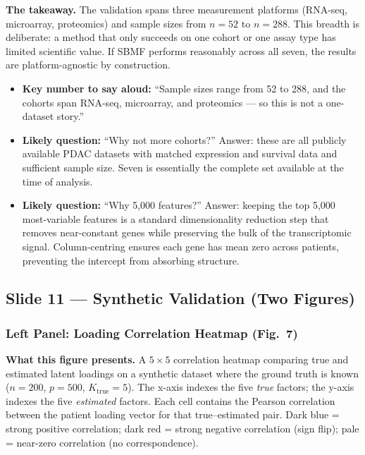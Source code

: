 \documentclass[11pt]{article}
\newcommand{\sectionlabel}[1]{\textbf{#1}}
\begin{document}
\textbf{The takeaway.} The validation spans three measurement platforms (RNA-seq, microarray, proteomics) and sample sizes from $n = 52$ to $n = 288$. This breadth is deliberate: a method that only succeeds on one cohort or one assay type has limited scientific value. If SBMF performs reasonably across all seven, the results are platform-agnostic by construction.

\begin{itemize}
  \item \sectionlabel{Key number to say aloud:} ``Sample sizes range from 52 to 288, and the cohorts span RNA-seq, microarray, and proteomics --- so this is not a one-dataset story.''
  \item \sectionlabel{Likely question:} ``Why not more cohorts?'' Answer: these are all publicly available PDAC datasets with matched expression and survival data and sufficient sample size. Seven is essentially the complete set available at the time of analysis.
  \item \sectionlabel{Likely question:} ``Why 5,000 features?'' Answer: keeping the top 5,000 most-variable features is a standard dimensionality reduction step that removes near-constant genes while preserving the bulk of the transcriptomic signal. Column-centring ensures each gene has mean zero across patients, preventing the intercept from absorbing structure.
\end{itemize}

\subsection*{Slide 11 --- Synthetic Validation (Two Figures)}

\subsubsection*{Left Panel: Loading Correlation Heatmap (Fig.~7)}

\textbf{What this figure presents.} A $5 \times 5$ correlation heatmap comparing true and estimated latent loadings on a synthetic dataset where the ground truth is known ($n = 200$, $p = 500$, $K_\text{true} = 5$). The x-axis indexes the five \emph{true} factors; the y-axis indexes the five \emph{estimated} factors. Each cell contains the Pearson correlation between the patient loading vector for that true--estimated pair. Dark blue = strong positive correlation; dark red = strong negative correlation (sign flip); pale = near-zero correlation (no correspondence).
\end{document}

